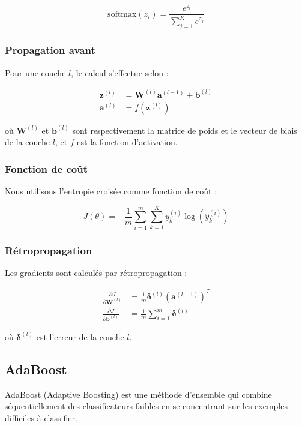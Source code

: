 \begin{equation}
    \text{softmax}(z_i) = \frac{e^{z_i}}{\sum_{j=1}^{K} e^{z_j}}
\end{equation}

\subsubsection{Propagation avant}
Pour une couche $l$, le calcul s'effectue selon :

\begin{align}
    \mathbf{z}^{(l)} &= \mathbf{W}^{(l)}\mathbf{a}^{(l-1)} + \mathbf{b}^{(l)} \\
    \mathbf{a}^{(l)} &= f(\mathbf{z}^{(l)})
\end{align}

où $\mathbf{W}^{(l)}$ et $\mathbf{b}^{(l)}$ sont respectivement la matrice de poids et le vecteur de biais de la couche $l$, et $f$ est la fonction d'activation.

\subsubsection{Fonction de coût}
Nous utilisons l'entropie croisée comme fonction de coût :

\begin{equation}
    J(\theta) = -\frac{1}{m}\sum_{i=1}^{m}\sum_{k=1}^{K} y_k^{(i)} \log(\hat{y}_k^{(i)})
\end{equation}

\subsubsection{Rétropropagation}
Les gradients sont calculés par rétropropagation :

\begin{align}
    \frac{\partial J}{\partial \mathbf{W}^{(l)}} &= \frac{1}{m}\boldsymbol{\delta}^{(l)}(\mathbf{a}^{(l-1)})^T \\
    \frac{\partial J}{\partial \mathbf{b}^{(l)}} &= \frac{1}{m}\sum_{i=1}^{m}\boldsymbol{\delta}^{(l)}
\end{align}

où $\boldsymbol{\delta}^{(l)}$ est l'erreur de la couche $l$.

\subsection{AdaBoost}

AdaBoost (Adaptive Boosting) est une méthode d'ensemble qui combine séquentiellement des classificateurs faibles en se concentrant sur les exemples difficiles à classifier.


